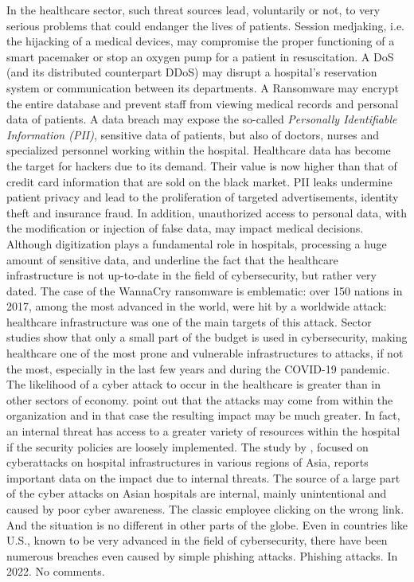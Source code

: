 In the healthcare sector, such threat sources lead, voluntarily or not, to very serious problems that could endanger the lives of patients. Session medjaking, i.e. the hijacking of a medical devices, may compromise the proper functioning of a smart pacemaker or stop an oxygen pump for a patient in resuscitation. A DoS (and its distributed counterpart DDoS) may disrupt a hospital's reservation system or communication between its departments. A Ransomware may encrypt the entire database and prevent staff from viewing medical records and personal data of patients. A data breach may expose the so-called \textit{Personally Identifiable Information (PII)}, sensitive data of patients, but also of doctors, nurses and specialized personnel working within the hospital. Healthcare data has become the target for hackers due to its demand. Their value is now higher than that of credit card information that are sold on the black market. PII leaks undermine patient privacy and lead to the proliferation of targeted advertisements, identity theft and insurance fraud. In addition, unauthorized access to personal data, with the modification or injection of false data, may impact medical decisions. Although digitization plays a fundamental role in hospitals, processing a huge amount of sensitive data, \cite{Rajamaki2018} and \cite{Khadija2021} underline the fact that the healthcare infrastructure is not up-to-date in the field of cybersecurity, but rather very dated. The case of the WannaCry ransomware is emblematic: over 150 nations in 2017, among the most advanced in the world, were hit by a worldwide attack: healthcare infrastructure was one of the main targets of this attack. Sector studies show that only a small part of the budget is used in cybersecurity, making healthcare one of the most prone and vulnerable infrastructures to attacks, if not the most, especially in the last few years and during the COVID-19 pandemic. The likelihood of a cyber attack to occur in the healthcare is greater than in other sectors of economy. \cite{Dogaru2017} point out that the attacks may come from within the organization and in that case the resulting impact may be much greater. In fact, an internal threat has access to a greater variety of resources within the hospital if the security policies are loosely implemented. The study by \cite{Kandasamy2022}, focused on cyberattacks on hospital infrastructures in various regions of Asia, reports important data on the impact due to internal threats. The source of a large part of the cyber attacks on Asian hospitals are internal, mainly unintentional and caused by poor cyber awareness. The classic employee clicking on the wrong link. And the situation is no different in other parts of the globe. Even in countries like U.S., known to be very advanced in the field of cybersecurity, there have been numerous breaches even caused by simple phishing attacks. Phishing attacks. In 2022. No comments.
